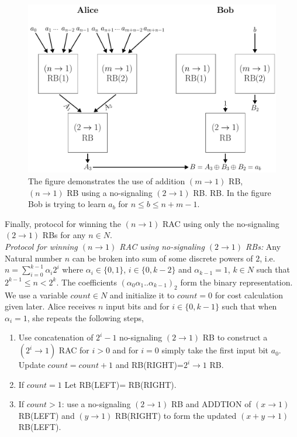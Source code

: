\begin{figure} 
\includegraphics[scale=0.325]{ADD.pdf}
\caption{  The figure demonstrates the use of addition $(m\rightarrow1)$ RB, $(n\rightarrow 1)$ RB using
a no-signaling $(2\rightarrow1)$ RB.
RB. In the figure Bob is trying to learn $a_b$ for $n\leq b\leq n+m-1$.}
\end{figure}
Finally, protocol for winning the $(n\rightarrow 1)$ RAC using only the no-signaling $(2\rightarrow 1)$ RBs for any $n\in N$. \\
\textit{Protocol for  winning $(n\rightarrow1)$ RAC using no-signaling $(2\rightarrow1)$ RBs:} Any Natural number $n$ can be broken into sum of some discrete powers of $2$, i.e. $n=\sum_{i=0}^{k-1}\alpha_i2^i$ where $\alpha_i\in \{0,1\}$, $i\in\{0,k-2\}$ and $\alpha_{k-1}=1$, $k\in N$ such that $2^{k-1}\leq n< 2^k$. The coefficients $(\alpha_0\alpha_1..\alpha_{k-1})_2$ form the binary representation. We use a variable $count\in N$ and initialize it to $count=0$ for cost calculation given later. Alice receives $n$ input bits and for $i\in \{0,k-1\}$ such that when $\alpha_i=1$, she repeats the following steps,
\begin{enumerate}
\item Use concatenation of $2^i-1$ no-signaling $(2\rightarrow 1)$ RB to construct a $(2^i\rightarrow 1)$ RAC for $i>0$ and for $i=0$ simply take the first input bit $a_0$. Update $count=count+1$ and RB(RIGHT)=$2^i\rightarrow 1$ RB.
\item If $count=1$ Let RB(LEFT)= RB(RIGHT).
\item  If $count>1$: use a no-signaling $(2\rightarrow1)$ RB and ADDTION of $(x\rightarrow1)$ RB(LEFT) and $(y\rightarrow1)$ RB(RIGHT) to form the updated $(x+y\rightarrow 1)$ RB(LEFT).
\end{enumerate}
